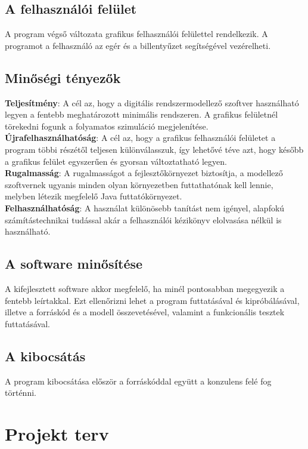 \subsection{A felhasználói felület}

A program végső változata grafikus felhasználói felülettel rendelkezik. A programot a felhasználó az egér és a billentyűzet segítségével vezérelheti.

\subsection{Minőségi tényezők}

\textbf{Teljesítmény}: A cél az, hogy a digitális rendszermodellező szoftver használható legyen a fentebb meghatározott minimális rendszeren. A grafikus felületnél törekedni fogunk a folyamatos szimuláció megjelenítése.\\
\textbf{Újrafelhasználhatóság}: A cél az, hogy a grafikus felhasználói felületet a program többi részétől teljesen különválasszuk, így lehetővé téve azt, hogy később a grafikus felület egyszerűen és gyorsan változtatható legyen.\\
\textbf{Rugalmasság}: A rugalmasságot a fejlesztőkörnyezet biztosítja, a modellező szoftvernek ugyanis minden olyan környezetben futtathatónak kell lennie, melyben létezik megfelelő Java futtatókörnyezet.\\
\textbf{Felhasználhatóság}: A használat különösebb tanítást nem igényel, alapfokú számítástechnikai tudással akár a felhasználói kézikönyv elolvasása nélkül is használható.

\subsection{A software minősítése}

A kifejlesztett software akkor megfelelő, ha minél pontosabban megegyezik a fentebb leírtakkal. Ezt ellenőrizni lehet a program futtatásával és kipróbálásával, illetve a forráskód és a modell összevetésével, valamint a funkcionális tesztek futtatásával.

\subsection{A kibocsátás}

A program kibocsátása először a forráskóddal együtt a konzulens felé fog történni.

\section{Projekt terv}

